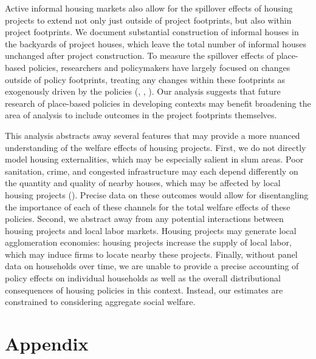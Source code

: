 \documentclass[12pt]{article}
\begin{document}
Active informal housing markets also allow for the spillover effects of housing projects to extend not only just outside of project footprints, but also within project footprints.  We document substantial construction of informal houses in the backyards of project houses, which leave the total number of informal houses unchanged after project construction.  To measure the spillover effects of place-based policies, researchers and policymakers have largely focused on changes outside of policy footprints, treating any changes within these footprints as exogenously driven by the policies (\cite{diamond2016wants}, \cite{rossi2010housing}, \cite{hornbeck2017creative}).  Our analysis suggests that future research of place-based policies in developing contexts may benefit broadening the area of analysis to include outcomes in the project footprints themselves.

This analysis abstracts away several features that may provide a more nuanced understanding of the welfare effects of housing projects.  First, we do not directly model housing externalities, which may be especially salient in slum areas.  Poor sanitation, crime, and congested infrastructure may each depend differently on the quantity and quality of nearby houses, which may be affected by local housing projects (\cite{marxthere}).  Precise data on these outcomes would allow for disentangling the importance of each of these channels for the total welfare effects of these policies.  Second, we abstract away from any potential interactions between housing projects and local labor markets.  Housing projects may generate local agglomeration economies:  housing projects increase the supply of local labor, which may induce firms to locate nearby these projects.  Finally, without panel data on households over time, we are unable to provide a precise accounting of policy effects on individual households as well as the overall distributional consequences of housing policies in this context.  Instead, our estimates are constrained to considering aggregate social welfare.


\pagebreak

\nocite{*}
\singlespacing
\setlength{\bibsep}{7pt}





\pagebreak
\appendix
\doublespacing

\section{Appendix}
\end{document}

